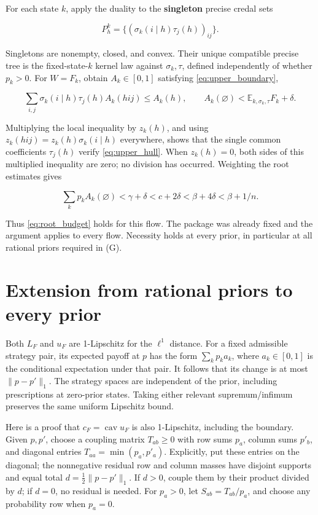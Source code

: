 \documentclass[11pt,a4paper]{article}
\begin{document}
For each state \(k\), apply the duality to the \textbf{singleton} precise credal sets

\[
P^{k}_h=\{(\sigma_k(i\mid h)\tau_j(h))_{ij}\}.
\]

Singletons are nonempty, closed, and convex. Their unique compatible precise tree is the fixed-state-\(k\) kernel law against \(\sigma_k,\tau\), defined independently of whether \(p_k>0\). For \(W=F_k\), obtain \(A_k\in[0,1]\) satisfying \eqref{eq:upper_boundary},

\begin{equation}
\sum_{i,j}\sigma_k(i\mid h)\tau_j(h)A_k(hij)\le A_k(h),
\qquad
A_k(\varnothing)<\mathbb E_{k,\sigma_k,\tau}F_k+\delta.
\label{eq:precise_hedge}
\end{equation}

Multiplying the local inequality by \(z_k(h)\), and using \(z_k(hij)=z_k(h)\sigma_k(i\mid h)\) everywhere, shows that the single common coefficients \(\tau_j(h)\) verify \eqref{eq:upper_hull}. When \(z_k(h)=0\), both sides of this multiplied inequality are zero; no division has occurred. Weighting the root estimates gives

\[
\sum_kp_kA_k(\varnothing)<\gamma+\delta<c+2\delta
<\beta+4\delta<\beta+1/n.
\]

Thus \eqref{eq:root_budget} holds for this flow. The package was already fixed and the argument applies to every flow. Necessity holds at every prior, in particular at all rational priors required in (G).

\section{Extension from rational priors to every prior}

Both \(L_F\) and \(u_F\) are 1-Lipschitz for the \(\ell^1\) distance. For a fixed admissible strategy pair, its expected payoff at \(p\) has the form \(\sum_kp_ka_k\), where \(a_k\in[0,1]\) is the conditional expectation under that pair. It follows that its change is at most \(\|p-p'\|_1\). The strategy spaces are independent of the prior, including prescriptions at zero-prior states. Taking either relevant supremum/infimum preserves the same uniform Lipschitz bound.

Here is a proof that \(c_F=\operatorname{cav}u_F\) is also 1-Lipschitz, including the boundary. Given \(p,p'\), choose a coupling matrix \(T_{ab}\ge0\) with row sums \(p_a\), column sums \(p'_b\), and diagonal entries \(T_{aa}=\min(p_a,p'_a)\). Explicitly, put these entries on the diagonal; the nonnegative residual row and column masses have disjoint supports and equal total \(d=\tfrac12\|p-p'\|_1\). If \(d>0\), couple them by their product divided by \(d\); if \(d=0\), no residual is needed. For \(p_a>0\), let \(S_{ab}=T_{ab}/p_a\), and choose any probability row when \(p_a=0\).
\end{document}
